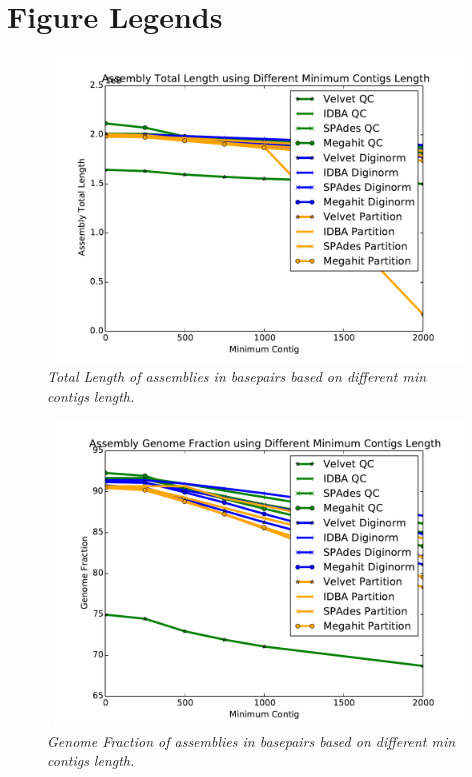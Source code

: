 


\section*{Figure Legends}
%
\begin{figure} [h] 
 
\begin{center}  
 

\includegraphics[height=3.2in,width=4.5in]{total-length-contigs.pdf}  
\caption{\small \sl Total Length of assemblies in basepairs based on different min contigs length.\label{fig:mincontig}}  
\end{center}  
\end{figure}  
 

\begin{figure} [h] 
\begin{center}  
 
\includegraphics[height=3.2in,width=4.5in]{genome-fraction-contigs.pdf}  
\caption{\small \sl Genome Fraction of assemblies in basepairs based on different min contigs length.\label{fig:gf}}  
\end{center}  
\end{figure}  

